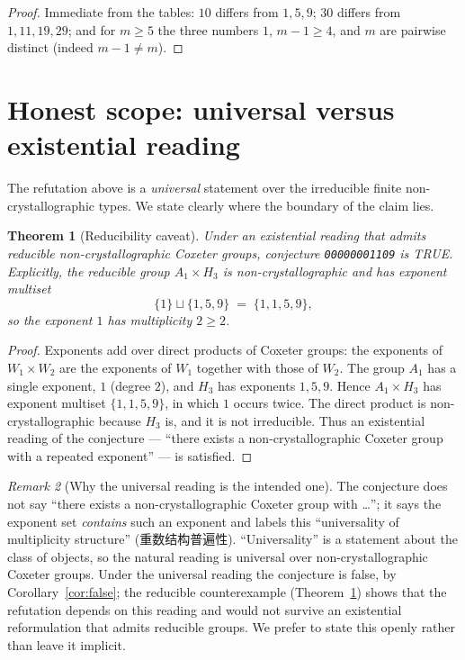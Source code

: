 \documentclass[11pt]{article}
\newtheorem{theorem}{Theorem}
\theoremstyle{definition}
\theoremstyle{remark}
\newtheorem{remark}[theorem]{Remark}
\begin{document}
\begin{proof}
Immediate from the tables: $10$ differs from $1,5,9$; $30$ differs from
$1,11,19,29$; and for $m \ge 5$ the three numbers $1$, $m-1 \ge 4$, and $m$
are pairwise distinct (indeed $m-1 \ne m$).
\end{proof}

\section{Honest scope: universal versus existential reading}
\label{sec:scope}

The refutation above is a \emph{universal} statement over the irreducible
finite non-crystallographic types. We state clearly where the boundary of the
claim lies.

\begin{theorem}[Reducibility caveat]\label{thm:reducible}
Under an \emph{existential} reading that admits reducible non-crystallographic
Coxeter groups, conjecture \texttt{00000001109} is TRUE. Explicitly, the
reducible group $A_1 \times H_3$ is non-crystallographic and has exponent
multiset
\[
\{1\} \sqcup \{1, 5, 9\} \;=\; \{1, 1, 5, 9\},
\]
so the exponent $1$ has multiplicity $2 \ge 2$.
\end{theorem}

\begin{proof}
Exponents add over direct products of Coxeter groups: the exponents of
$W_1 \times W_2$ are the exponents of $W_1$ together with those of $W_2$.
The group $A_1$ has a single exponent, $1$ (degree $2$), and $H_3$ has
exponents $1, 5, 9$. Hence $A_1 \times H_3$ has exponent multiset
$\{1,1,5,9\}$, in which $1$ occurs twice. The direct product is
non-crystallographic because $H_3$ is, and it is not irreducible. Thus an
existential reading of the conjecture --- ``there exists a non-crystallographic
Coxeter group with a repeated exponent'' --- is satisfied.
\end{proof}

\begin{remark}[Why the universal reading is the intended one]
The conjecture does not say ``there exists a non-crystallographic Coxeter
group with \dots''; it says the exponent set \emph{contains} such an exponent
and labels this ``universality of multiplicity structure'' (重数结构普遍性).
``Universality'' is a statement about the class of objects, so the natural
reading is universal over non-crystallographic Coxeter groups. Under the
universal reading the conjecture is false, by
Corollary~\ref{cor:false}; the reducible counterexample
(Theorem~\ref{thm:reducible}) shows that the refutation depends on this
reading and would not survive an existential reformulation that admits
reducible groups. We prefer to state this openly rather than leave it implicit.
\end{remark}
\end{document}
